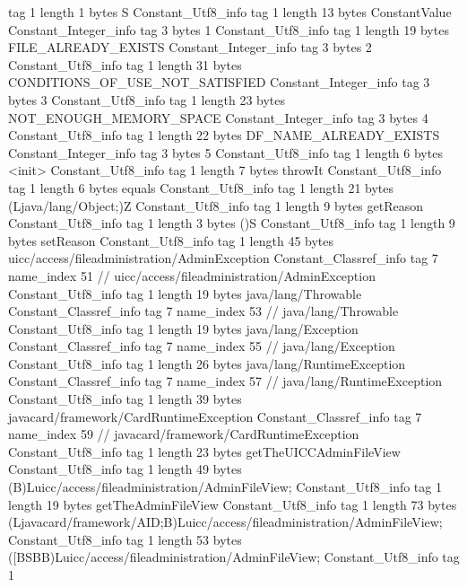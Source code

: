{{{			tag	1
			length	1
			bytes	S
		}
		Constant_Utf8_info {
			tag	1
			length	13
			bytes	ConstantValue
		}
		Constant_Integer_info {
			tag	3
			bytes	1
		}
		Constant_Utf8_info {
			tag	1
			length	19
			bytes	FILE_ALREADY_EXISTS
		}
		Constant_Integer_info {
			tag	3
			bytes	2
		}
		Constant_Utf8_info {
			tag	1
			length	31
			bytes	CONDITIONS_OF_USE_NOT_SATISFIED
		}
		Constant_Integer_info {
			tag	3
			bytes	3
		}
		Constant_Utf8_info {
			tag	1
			length	23
			bytes	NOT_ENOUGH_MEMORY_SPACE
		}
		Constant_Integer_info {
			tag	3
			bytes	4
		}
		Constant_Utf8_info {
			tag	1
			length	22
			bytes	DF_NAME_ALREADY_EXISTS
		}
		Constant_Integer_info {
			tag	3
			bytes	5
		}
		Constant_Utf8_info {
			tag	1
			length	6
			bytes	<init>
		}
		Constant_Utf8_info {
			tag	1
			length	7
			bytes	throwIt
		}
		Constant_Utf8_info {
			tag	1
			length	6
			bytes	equals
		}
		Constant_Utf8_info {
			tag	1
			length	21
			bytes	(Ljava/lang/Object;)Z
		}
		Constant_Utf8_info {
			tag	1
			length	9
			bytes	getReason
		}
		Constant_Utf8_info {
			tag	1
			length	3
			bytes	()S
		}
		Constant_Utf8_info {
			tag	1
			length	9
			bytes	setReason
		}
		Constant_Utf8_info {
			tag	1
			length	45
			bytes	uicc/access/fileadministration/AdminException
		}
		Constant_Classref_info {
			tag	7
			name_index	51		// uicc/access/fileadministration/AdminException
		}
		Constant_Utf8_info {
			tag	1
			length	19
			bytes	java/lang/Throwable
		}
		Constant_Classref_info {
			tag	7
			name_index	53		// java/lang/Throwable
		}
		Constant_Utf8_info {
			tag	1
			length	19
			bytes	java/lang/Exception
		}
		Constant_Classref_info {
			tag	7
			name_index	55		// java/lang/Exception
		}
		Constant_Utf8_info {
			tag	1
			length	26
			bytes	java/lang/RuntimeException
		}
		Constant_Classref_info {
			tag	7
			name_index	57		// java/lang/RuntimeException
		}
		Constant_Utf8_info {
			tag	1
			length	39
			bytes	javacard/framework/CardRuntimeException
		}
		Constant_Classref_info {
			tag	7
			name_index	59		// javacard/framework/CardRuntimeException
		}
		Constant_Utf8_info {
			tag	1
			length	23
			bytes	getTheUICCAdminFileView
		}
		Constant_Utf8_info {
			tag	1
			length	49
			bytes	(B)Luicc/access/fileadministration/AdminFileView;
		}
		Constant_Utf8_info {
			tag	1
			length	19
			bytes	getTheAdminFileView
		}
		Constant_Utf8_info {
			tag	1
			length	73
			bytes	(Ljavacard/framework/AID;B)Luicc/access/fileadministration/AdminFileView;
		}
		Constant_Utf8_info {
			tag	1
			length	53
			bytes	([BSBB)Luicc/access/fileadministration/AdminFileView;
		}
		Constant_Utf8_info {
			tag	1
}}}
